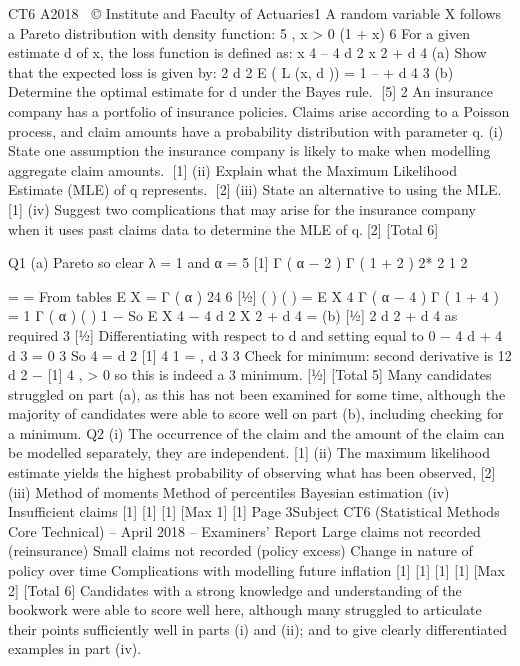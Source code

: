 \documentclass[a4paper,12pt]{article}
\begin{document}
CT6 A2018 
© Institute and Faculty of Actuaries1
A random variable X follows a Pareto distribution with density function:
5
, x > 0
(1 + x) 6
For a given estimate d of x, the loss function is defined as:
x 4 – 4 d 2 x 2 + d 4
(a)
Show that the expected loss is given by:
2 d 2
E ( L (x, d )) = 1 –
+ d 4
3
(b)
Determine the optimal estimate for d under the Bayes rule.
[5]
2
An insurance company has a portfolio of insurance policies. Claims arise according to a Poisson process, and claim amounts have a probability distribution with parameter q.
(i) State one assumption the insurance company is likely to make when modelling
aggregate claim amounts.
[1]
(ii) Explain what the Maximum Likelihood Estimate (MLE) of q represents.
[2]
(iii) State an alternative to using the MLE.
[1]
(iv) Suggest two complications that may arise for the insurance company when it uses past claims data to determine the MLE of q.[2]
[Total 6]


Q1
(a)
Pareto so clear λ = 1 and α = 5 [1]
Γ ( α − 2 ) Γ ( 1 + 2 ) 2* 2 1
2
  
= =
From tables E X =
Γ ( α )
24 6 [1⁄2]
( )
( )
=
E X 4
Γ ( α − 4 ) Γ ( 1 + 4 )
= 1
Γ ( α )
(
)
1 −
So E X 4 − 4 d 2 X 2 + d 4 =
(b)
[1⁄2]
2 d 2
+ d 4 as required
3
[1⁄2]
Differentiating with respect to d and setting equal to 0
−
4 d
+ 4 d 3 = 0
3
So 4 =
d 2
[1]
4
1
=
,  
d
3
3
Check for minimum: second derivative is 12 d 2 −
[1]
4
, > 0 so this is indeed a
3
minimum.
[1⁄2]
[Total 5]
Many candidates struggled on part (a), as this has not been examined
for some time, although the majority of candidates were able to score
well on part (b), including checking for a minimum.
Q2
(i) The occurrence of the claim and the amount of the claim can be modelled
separately, they are independent.
[1]
(ii) The maximum likelihood estimate yields the highest probability of observing
what has been observed,
[2]
(iii) Method of moments
Method of percentiles
Bayesian estimation
(iv) Insufficient claims
[1]
[1]
[1]
[Max 1]
[1]
Page 3Subject CT6 (Statistical Methods Core Technical) – April 2018 – Examiners’ Report
Large claims not recorded (reinsurance)
Small claims not recorded (policy excess)
Change in nature of policy over time
Complications with modelling future inflation
[1]
[1]
[1]
[1]
[Max 2]
[Total 6]
Candidates with a strong knowledge and understanding of the
bookwork were able to score well here, although many struggled to
articulate their points sufficiently well in parts (i) and (ii); and to give
clearly differentiated examples in part (iv).
\end{document}
